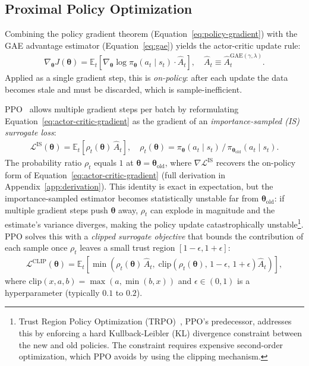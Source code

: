 \subsection{Proximal Policy Optimization}
\label{sec:ppo}

Combining the policy gradient theorem (Equation~\ref{eq:policy-gradient}) with the GAE advantage estimator (Equation~\ref{eq:gae}) yields the actor-critic update rule:
\begin{align}
\nabla_{\boldsymbol{\theta}} J(\boldsymbol{\theta}) 
= \mathbb{E}_t\!\left[\nabla_{\boldsymbol{\theta}} 
\log \pi_{\boldsymbol{\theta}}(a_t \mid s_t) \cdot \hat{A}_t\right], \quad \hat{A}_t \equiv \hat{A}_t^{\text{GAE}(\gamma,\lambda)}.
\label{eq:actor-critic-gradient}
\end{align}
Applied as a single gradient step, this is \emph{on-policy}: after each update the data becomes stale and must be discarded, which is sample-inefficient.

PPO~\cite{schulmanProximalPolicyOptimization2017} allows multiple gradient steps per batch by reformulating Equation~\ref{eq:actor-critic-gradient} as the gradient of an \emph{importance-sampled (IS) surrogate loss}:
\begin{align}
\mathcal{L}^{\text{IS}}(\boldsymbol{\theta}) 
= \mathbb{E}_t\!\left[\rho_t(\boldsymbol{\theta})\, \hat{A}_t\right],
\quad \rho_t(\boldsymbol{\theta}) 
= \pi_{\boldsymbol{\theta}}(a_t \mid s_t) \,/\, \pi_{\boldsymbol{\theta}_{\text{old}}}(a_t \mid s_t).
\label{eq:surrogate-is}
\end{align}
The probability ratio $\rho_t$ equals $1$ at $\boldsymbol{\theta} = \boldsymbol{\theta}_{\text{old}}$, 
where $\nabla \mathcal{L}^{\text{IS}}$ recovers the on-policy form of Equation~\ref{eq:actor-critic-gradient} (full derivation in Appendix~\ref{app:derivation}). This identity is exact in expectation, but the importance-sampled 
estimator becomes statistically unstable far from $\boldsymbol{\theta}_{\text{old}}$: 
if multiple gradient steps push $\boldsymbol{\theta}$ away, $\rho_t$ can explode in magnitude and the estimate's variance diverges, making the policy update catastrophically unstable\footnote{Trust Region Policy Optimization (TRPO)~\cite{schulmanTrustRegionPolicy2015}, PPO's predecessor, addresses this by enforcing a hard Kullback-Leibler (KL) divergence constraint between the new and old policies. The constraint requires expensive second-order optimization, which PPO avoids by using the clipping mechanism.}.
PPO solves this with a \emph{clipped surrogate objective} that bounds the contribution of each sample once $\rho_t$ leaves a small trust region 
$[1-\epsilon, 1+\epsilon]$:
\begin{align}
\mathcal{L}^{\text{CLIP}}(\boldsymbol{\theta})
= \mathbb{E}_t\!\left[
\min\!\left(
\rho_t(\boldsymbol{\theta})\, \hat{A}_t,\;
\text{clip}\!\left(\rho_t(\boldsymbol{\theta}),\, 1-\epsilon,\, 1+\epsilon\right)\hat{A}_t
\right)
\right],
\label{eq:ppo-clip}
\end{align}
where $\text{clip}(x, a, b) = \max(a, \min(b, x))$ and $\epsilon \in (0,1)$ is a hyperparameter (typically $0.1$ to $0.2$).


